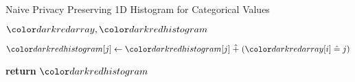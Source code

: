 \begin{algorithm}[H]
\caption{Naive Privacy Preserving 1D Histogram for Categorical Values}\label{a:1d-simple-histogram-categorical}
\begin{algorithmic}[1]
\renewcommand{\algorithmicrequire}{\textbf{Private Vars:}}
\Require $\red{array}, \red{histogram}$




            \State $\red{histogram}[j] \gets \red{histogram}[j] \hplus (\red{array}[i] \heq j)$

        \EndFor{}
    \EndFor
    \State \textbf{return} {$\red{histogram}$}
\EndProcedure
\end{algorithmic}
\end{algorithm}
